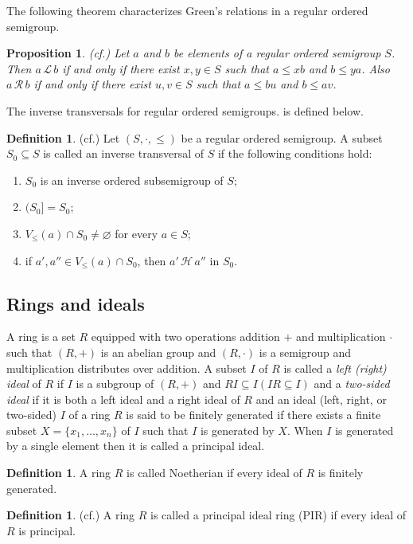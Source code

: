 \documentclass[12pt,a4paper]{amsart}
\theoremstyle{plain}
\newtheorem{proposition}[theorem]{Proposition}
\theoremstyle{definition}
\newtheorem{definition}[theorem]{Definition}
\begin{document}
The following theorem characterizes Green’s relations in a regular ordered semigroup.
\begin{proposition}(cf.\cite{mpk})
	Let $ a $ and $ b $ be elements of a regular ordered semigroup $ S $. Then 	$ a\,\mathscr{L} \,b $ if and only if there exist $ x,y \in{S} $ such that $ a \leq xb $ and $ b \leq ya $. Also $ a\,\mathscr{R} \,b $ if and only if there exist $ u,v \in{S} $ such that $ a \leq bu $ and $ b \leq av $.
\end{proposition}
The inverse transversals for regular ordered semigroups. is defined below.  
\begin{definition}\label{definvtrsl}(cf.\cite{mpkinverse})
	Let $(S,\cdot,\leq)$ be a regular ordered semigroup. A subset $S_{0}\subseteq S$
	is called an inverse transversal of $S$ if the following conditions hold:
	\begin{enumerate}
		\item $S_{0}$ is an inverse ordered subsemigroup of $S$;
		\item $(S_{0}] = S_{0}$;
		\item $V_{\le}(a)\cap S_{0} \neq \varnothing$ for every $a \in S$;
		\item if $a',a'' \in V_{\le}(a)\cap S_{0}$, then $a' \,\mathcal{H}\, a''$ in $S_{0}$.
	\end{enumerate}
\end{definition}
\subsection{Rings and ideals}
A ring is a set $R$ equipped with two operations  addition $+$ and  multiplication $\cdot$ such that $(R,+)$ is an abelian group and $(R,\cdot)$ is a semigroup and multiplication distributes over addition. 
A subset $I$ of $R$ is called a \emph{left (right) ideal} of $R$ if $I$ is a subgroup of $(R,+)$ and $RI \subseteq I (IR \subseteq I)$ and a \emph{two-sided ideal} if it is both a left
ideal and a right ideal of $R$ and an ideal (left, right, or two-sided) $I$ of a ring $R$ is said to be finitely generated if there exists a finite subset $X=\{x_1,\dots,x_n\}$ of $I$ such that $I$ is generated by $X$. When $I$ is generated by a single element then it is called a principal ideal.
\begin{definition}
	A ring $R$ is called Noetherian if every ideal of $R$ is finitely generated.
\end{definition}
\begin{definition}(cf.\cite{musili})
	A ring $R$ is called a principal ideal ring (PIR) if every ideal of $R$ is principal.
\end{definition}
\end{document}
